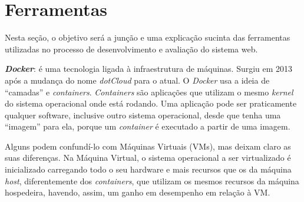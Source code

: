 % 
% 


\hspace{2.5cm}
\section{Ferramentas}
\label{sec:ferramentas}

\hspace{2.5cm}

Nesta seção, o objetivo será a junção e uma explicação sucinta das ferramentas utilizadas no processo de desenvolvimento e avaliação do sistema web.  




%  

\textbf{\textit{Docker}}: é uma tecnologia ligada à infraestrutura de máquinas. Surgiu em 2013 após a mudança do nome \textit{dotCloud} para o atual. O \textit{Docker} usa a ideia de ``camadas'' e \textit{containers}. \textit{Containers} são aplicações que utilizam o mesmo \textit{kernel} do sistema operacional onde está rodando. Uma aplicação pode ser praticamente qualquer software, inclusive outro sistema operacional, desde que tenha uma ``imagem'' para ela, porque um \textit{container} é executado a partir de uma imagem.

Alguns podem confundí-lo com Máquinas Virtuais (VMs), mas  deixam claro as suas diferenças. Na Máquina Virtual, o sistema operacional a ser virtualizado é inicializado carregando todo o seu hardware e mais recursos que os da máquina \textit{host}, diferentemente dos \textit{containers}, que utilizam os mesmos recursos da máquina hospedeira, havendo, assim, um ganho em desempenho em relação à VM.

